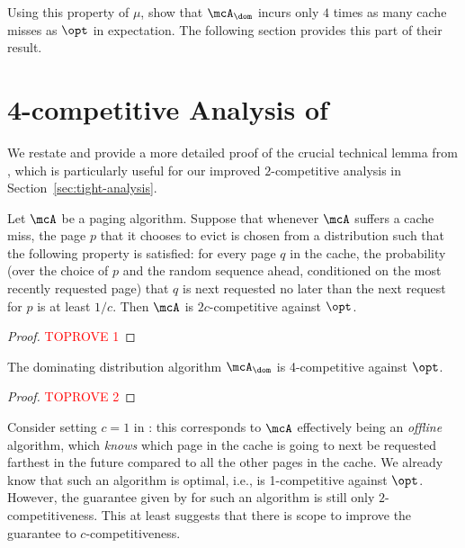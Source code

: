 \documentclass[11pt]{article}
\begin{document}
Using this property of $\mu$, \cite{lund1999paging} show that $\mcA_\dom$ incurs only $4$ times as many cache misses as $\opt$ in expectation. The following section provides this part of their result.

 \section{4-competitive Analysis of \cite{lund1999paging}}
\label{sec:lpr}

We restate and provide a more detailed proof of the crucial technical lemma from \cite{lund1999paging}, which is particularly useful for our improved $2$-competitive analysis in Section~\ref{sec:tight-analysis}.

\begin{lemma}
    \label{lem:lpr}
    Let $\mcA$ be a paging algorithm. Suppose that whenever $\mcA$ suffers a cache miss, the page $p$ that it chooses to evict is chosen from a distribution such that the following property is satisfied: for every page $q$ in the cache, the probability (over the choice of $p$ and the random sequence ahead, conditioned on the most recently requested page) that $q$ is next requested no later than the next request for $p$ is at least $1/c$. Then $\mcA$ is $2c$-competitive against $\opt$.
\end{lemma}
\begin{proof}\textcolor{red}{TOPROVE 1}\end{proof}

\begin{corollary}
    \label{corollary:dom-is-4-competitive}
    The dominating distribution algorithm $\mcA_\dom$ is 4-competitive against $\opt$.
\end{corollary}
\begin{proof}\textcolor{red}{TOPROVE 2}\end{proof}

\begin{remark}
    \label{remark:suboptimal-fifo}
    Consider setting $c=1$ in : this corresponds to $\mcA$ effectively being an \textit{offline} algorithm, which \textit{knows} which page in the cache is going to next be requested farthest in the future compared to all the other pages in the cache. We already know that such an algorithm is optimal, i.e., is 1-competitive against $\opt$. However, the guarantee given by  for such an algorithm is still only $2$-competitiveness. This at least suggests that there is scope to improve the guarantee to $c$-competitiveness. \end{remark}
\end{document}
